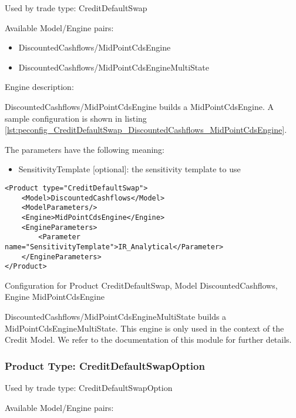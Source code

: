 Used by trade type: CreditDefaultSwap

Available Model/Engine pairs:

\begin{itemize}
\item DiscountedCashflows/MidPointCdsEngine
\item DiscountedCashflows/MidPointCdsEngineMultiState
\end{itemize}

Engine description:

DiscountedCashflows/MidPointCdsEngine builds a MidPointCdsEngine. A sample configuration is shown in listing
\ref{lst:peconfig_CreditDefaultSwap_DiscountedCashflows_MidPointCdsEngine}.

The parameters have the following meaning:

\begin{itemize}
\item SensitivityTemplate [optional]: the sensitivity template to use 
\end{itemize}

\begin{longlisting}
\begin{verbatim}
<Product type="CreditDefaultSwap">
    <Model>DiscountedCashflows</Model>
    <ModelParameters/>
    <Engine>MidPointCdsEngine</Engine>
    <EngineParameters>
        <Parameter name="SensitivityTemplate">IR_Analytical</Parameter>
    </EngineParameters>
</Product>
\end{verbatim}
\caption{Configuration for Product CreditDefaultSwap, Model DiscountedCashflows, Engine MidPointCdsEngine}
\label{lst:peconfig_CreditDefaultSwap_DiscountedCashflows_MidPointCdsEngine}
\end{longlisting}

DiscountedCashflows/MidPointCdsEngineMultiState builds a MidPointCdsEngineMultiState. This engine is only used in the
context of the Credit Model. We refer to the documentation of this module for further details.

\subsubsection{Product Type: CreditDefaultSwapOption}

Used by trade type: CreditDefaultSwapOption

Available Model/Engine pairs:

